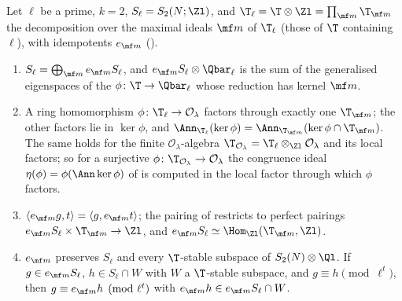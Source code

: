 \begin{proposition}\label{prop:hecke:local-components}
Let $\ell$ be a prime, $k=2$, $S_\ell=S_2(N;\Zl)$, and $\T_\ell=\T\otimes\Zl=\prod_{\mf m}\T_{\mf m}$ the decomposition over the maximal ideals $\mf m$ of $\T_\ell$ (those of $\T$ containing $\ell$), with
idempotents $e_{\mf m}$ ().
\begin{enumerate}[label=(\roman*)]
\item $S_\ell=\bigoplus_{\mf m}e_{\mf m}S_\ell$, and $e_{\mf m}S_\ell\otimes\Qbar_\ell$ is the sum of the generalised eigenspaces of the $\phi\colon\T\to\Qbar_\ell$ whose reduction has kernel $\mf m$.
\item A ring homomorphism $\phi\colon\T_\ell\to\mathcal O_\lambda$ factors through exactly one $\T_{\mf m}$; the other factors lie in $\ker\phi$, and $\Ann_{\T_\ell}(\ker\phi)=\Ann_{\T_{\mf m}}(\ker\phi\cap\T_{\mf m})$.
The same holds for the finite $\mathcal O_\lambda$-algebra $\T_{\mathcal O_\lambda}=\T_\ell\otimes_{\Zl}\mathcal O_\lambda$ and its local factors; so for a surjective $\phi\colon\T_{\mathcal O_\lambda}\to\mathcal O_\lambda$ the congruence
ideal $\eta(\phi)=\phi(\Ann\ker\phi)$ of  is computed in the local factor through which $\phi$ factors.
\item $\langle e_{\mf m}g,t\rangle=\langle g,e_{\mf m}t\rangle$; the pairing of  restricts to perfect pairings $e_{\mf m}S_\ell\times\T_{\mf m}\to\Zl$, and
$e_{\mf m}S_\ell\simeq\Hom_{\Zl}(\T_{\mf m},\Zl)$.
\item $e_{\mf m}$ preserves $S_\ell$ and every $\T$-stable subspace of $S_2(N)\otimes\Ql$. If $g\in e_{\mf m}S_\ell$, $h\in S_\ell\cap W$ with $W$ a $\T$-stable subspace, and $g\equiv h\pmod{\ell^t}$, then
$g\equiv e_{\mf m}h\pmod{\ell^t}$ with $e_{\mf m}h\in e_{\mf m}S_\ell\cap W$.
\end{enumerate}
\end{proposition}

